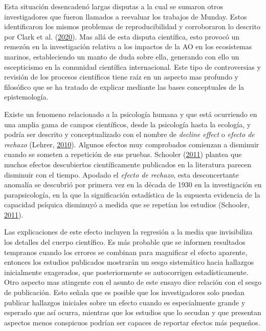 \documentclass[
]{article}
\begin{document}
Esta situación desencadenó largas disputas a la cual se sumaron otros
investigadores que fueron llamados a reevaluar los trabajos de Munday.
Estos identificaron los mismos problemas de reproducibilidad y
corroboraron lo descrito por Clark et al.
(\protect\hyperlink{ref-Clark2020}{2020}). Mas allá de esta disputa
científica, esto provocó un remezón en la investigación relativa a los
impactos de la AO en los ecosistemas marinos, estableciendo un manto de
duda sobre ella, generando con ello un escepticismo en la comunidad
científica internacional. Este tipo de controversias y revisión de los
procesos científicos tiene raíz en un aspecto mas profundo y filosófico
que se ha tratado de explicar mediante las bases conceptuales de la
epistemología.

Existe un fenomeno relacionado a la psicología humana y que está
ocurriendo en una amplia gama de campos científicos, desde la psicología
hasta la ecología, y podría ser descrito y conceptualizado con el nombre
de \emph{decline effect} o \emph{efecto de rechazo} (Lehrer,
\protect\hyperlink{ref-Lehrer2010}{2010}). Algunos efectos muy
comprobados comienzan a disminuir cuando se someten a repetición de sus
pruebas. Schooler (\protect\hyperlink{ref-Schooler2011a}{2011}) plantea
que muchos efectos descubiertos científicamente publicados en la
literatura parecen disminuir con el tiempo. Apodado el \emph{efecto de
rechazo}, esta desconcertante anomalía se descubrió por primera vez en
la década de 1930 en la investigación en parapsicología, en la que la
significación estadística de la supuesta evidencia de la capacidad
psíquica disminuyó a medida que se repetían los estudios (Schooler,
\protect\hyperlink{ref-Schooler2011a}{2011}).

Las explicaciones de este efecto incluyen la regresión a la media que
invisibiliza los detalles del cuerpo científico. Es más probable que se
informen resultados tempranos cuando los errores se combinan para
magnificar el efecto aparente, entonces los estudios publicados
mostrarán un sesgo sistemático hacia hallazgos inicialmente exagerados,
que posteriormente se autocorrigen estadísticamente. Otro aspecto mas
atingente con el asunto de este ensayo dice relación con el sesgo de
publicación. Esto señala que es posible que los investigadores solo
puedan publicar hallazgos iniciales sobre un efecto cuando es
especialmente grande y esperado que así ocurra, mientras que los
estudios que lo secudan y que presentan aspectos menos conspicuos
podrían ser capaces de reportar efectos más pequeños.
\end{document}
